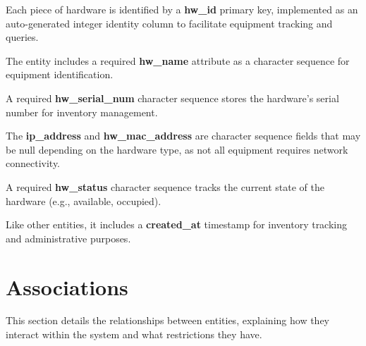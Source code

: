 Each piece of hardware is identified by a \textbf{hw\_id} primary key, implemented as an auto-generated integer identity column to facilitate equipment tracking and queries.

The entity includes a required \textbf{hw\_name} attribute as a character sequence for equipment identification.

A required \textbf{hw\_serial\_num} character sequence stores the hardware's serial number for inventory management.

The \textbf{ip\_address} and \textbf{hw\_mac\_address} are character sequence fields that may be null depending on the hardware type, as not all equipment requires network connectivity.

A required \textbf{hw\_status} character sequence tracks the current state of the hardware (e.g., available, occupied).

Like other entities, it includes a \textbf{created\_at} timestamp for inventory tracking and administrative purposes.

\section{Associations}
This section details the relationships between entities, explaining how they interact within the system and what restrictions they have.

